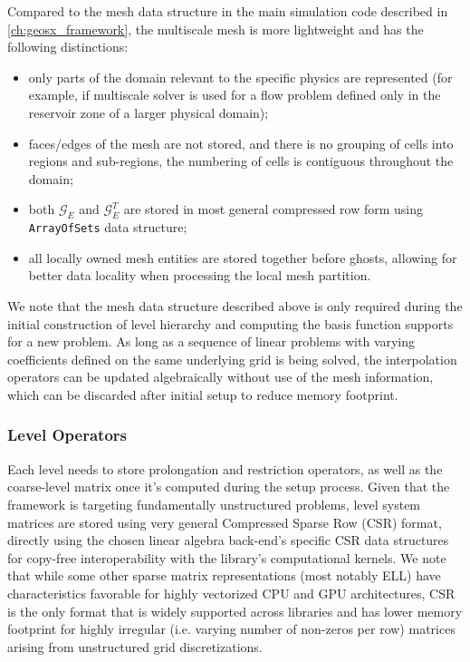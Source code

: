 Compared to the mesh data structure in the main simulation code described in \autoref{ch:geosx_framework}, the multiscale mesh is more lightweight and has the following distinctions:
\begin{itemize}
    \item only parts of the domain relevant to the specific physics are represented (for example, if multiscale solver is used for a flow problem defined only in the reservoir zone of a larger physical domain);
    \item faces/edges of the mesh are not stored, and there is no grouping of cells into regions and sub-regions, the numbering of cells is contiguous throughout the domain;
    \item both $\mathcal{G}_E$ and $\mathcal{G}_E^T$ are stored in most general compressed row form using \texttt{ArrayOfSets} data structure;
    \item all locally owned mesh entities are stored together before ghosts, allowing for better data locality when processing the local mesh partition.
\end{itemize}

We note that the mesh data structure described above is only required during the initial construction of level hierarchy and computing the basis function supports for a new problem.   As long as a sequence of linear problems with varying coefficients defined on the same underlying grid is being solved, the interpolation operators can be updated algebraically without use of the mesh information, which can be discarded after initial setup to reduce memory footprint.

\subsubsection{Level Operators}

Each level needs to store prolongation and restriction operators, as well as the coarse-level matrix once it's computed during the setup process.   Given that the framework is targeting fundamentally unstructured problems, level system matrices are stored using very general Compressed Sparse Row (CSR) format, directly using the chosen linear algebra back-end's specific CSR data structures for copy-free interoperability with the library's computational kernels.   We note that while some other sparse matrix representations (most notably ELL) have characteristics favorable for highly vectorized CPU and GPU architectures, CSR is the only format that is widely supported across libraries and has lower memory footprint for highly irregular (i.e. varying number of non-zeros per row) matrices arising from unstructured grid discretizations.

